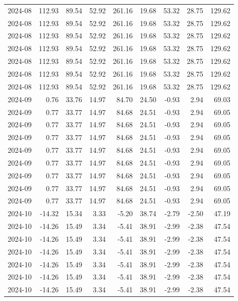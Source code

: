 \begin{table}[ht]
\begin{tabular}{lrrrrrrrr}
  2024-08 & 112.93 & 89.54 & 52.92 & 261.16 & 19.68 & 53.32 & 28.75 & 129.62 \\ 
  2024-08 & 112.93 & 89.54 & 52.92 & 261.16 & 19.68 & 53.32 & 28.75 & 129.62 \\ 
  2024-08 & 112.93 & 89.54 & 52.92 & 261.16 & 19.68 & 53.32 & 28.75 & 129.62 \\ 
  2024-08 & 112.93 & 89.54 & 52.92 & 261.16 & 19.68 & 53.32 & 28.75 & 129.62 \\ 
  2024-08 & 112.93 & 89.54 & 52.92 & 261.16 & 19.68 & 53.32 & 28.75 & 129.62 \\ 
  2024-08 & 112.93 & 89.54 & 52.92 & 261.16 & 19.68 & 53.32 & 28.75 & 129.62 \\ 
  2024-08 & 112.93 & 89.54 & 52.92 & 261.16 & 19.68 & 53.32 & 28.75 & 129.62 \\ 
  2024-09 & 0.76 & 33.76 & 14.97 & 84.70 & 24.50 & -0.93 & 2.94 & 69.03 \\ 
  2024-09 & 0.77 & 33.77 & 14.97 & 84.68 & 24.51 & -0.93 & 2.94 & 69.05 \\ 
  2024-09 & 0.77 & 33.77 & 14.97 & 84.68 & 24.51 & -0.93 & 2.94 & 69.05 \\ 
  2024-09 & 0.77 & 33.77 & 14.97 & 84.68 & 24.51 & -0.93 & 2.94 & 69.05 \\ 
  2024-09 & 0.77 & 33.77 & 14.97 & 84.68 & 24.51 & -0.93 & 2.94 & 69.05 \\ 
  2024-09 & 0.77 & 33.77 & 14.97 & 84.68 & 24.51 & -0.93 & 2.94 & 69.05 \\ 
  2024-09 & 0.77 & 33.77 & 14.97 & 84.68 & 24.51 & -0.93 & 2.94 & 69.05 \\ 
  2024-09 & 0.77 & 33.77 & 14.97 & 84.68 & 24.51 & -0.93 & 2.94 & 69.05 \\ 
  2024-09 & 0.77 & 33.77 & 14.97 & 84.68 & 24.51 & -0.93 & 2.94 & 69.05 \\ 
  2024-10 & -14.32 & 15.34 & 3.33 & -5.20 & 38.74 & -2.79 & -2.50 & 47.19 \\ 
  2024-10 & -14.26 & 15.49 & 3.34 & -5.41 & 38.91 & -2.99 & -2.38 & 47.54 \\ 
  2024-10 & -14.26 & 15.49 & 3.34 & -5.41 & 38.91 & -2.99 & -2.38 & 47.54 \\ 
  2024-10 & -14.26 & 15.49 & 3.34 & -5.41 & 38.91 & -2.99 & -2.38 & 47.54 \\ 
  2024-10 & -14.26 & 15.49 & 3.34 & -5.41 & 38.91 & -2.99 & -2.38 & 47.54 \\ 
  2024-10 & -14.26 & 15.49 & 3.34 & -5.41 & 38.91 & -2.99 & -2.38 & 47.54 \\ 
  2024-10 & -14.26 & 15.49 & 3.34 & -5.41 & 38.91 & -2.99 & -2.38 & 47.54 \\ 

\end{tabular}
\end{table}
